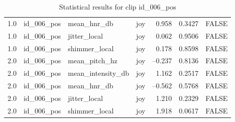 \begin{table}[ht]
\begin{subtable}[t]{0.48\textwidth}
\begin{tabular}{l l l l r r l}
          1.0  & id\_006\_pos   & mean\_hnr\_db         & joy     & 0.958        & 0.3427    & FALSE       \\
          1.0  & id\_006\_pos   & jitter\_local         & joy     & 0.062        & 0.9506    & FALSE       \\
          1.0  & id\_006\_pos   & shimmer\_local        & joy     & 0.178        & 0.8598    & FALSE       \\
          2.0  & id\_006\_pos   & mean\_pitch\_hz     & joy     & –0.237  & 0.8136 & FALSE \\
    2.0  & id\_006\_pos   & mean\_intensity\_db & joy     &  1.162  & 0.2517 & FALSE \\
    2.0  & id\_006\_pos   & mean\_hnr\_db       & joy     & –0.562  & 0.5768 & FALSE \\
    2.0  & id\_006\_pos   & jitter\_local       & joy     &  1.210  & 0.2329 & FALSE \\
    2.0  & id\_006\_pos   & shimmer\_local      & joy     &  1.918  & 0.0617 & FALSE \\
          \bottomrule
        \end{tabular}
    \end{subtable}
    \caption{Statistical results for clip id\_006\_pos}
    \label{tab:clip006_pos_stats}
  \end{table}
  

